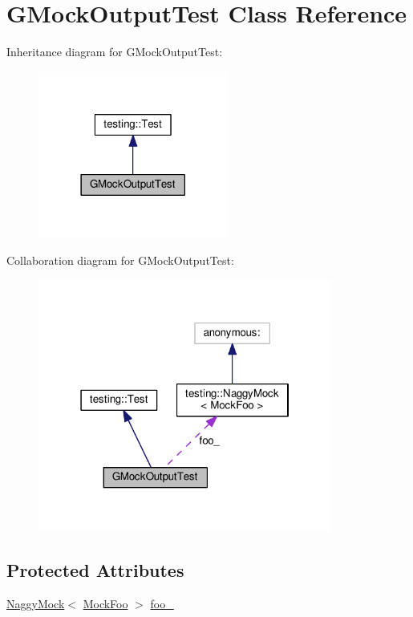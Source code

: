 \hypertarget{classGMockOutputTest}{}\section{G\+Mock\+Output\+Test Class Reference}
\label{classGMockOutputTest}


Inheritance diagram for G\+Mock\+Output\+Test\+:
\nopagebreak
\begin{figure}[H]
\begin{center}
\leavevmode
\includegraphics[width=177pt]{classGMockOutputTest__inherit__graph}
\end{center}
\end{figure}


Collaboration diagram for G\+Mock\+Output\+Test\+:
\nopagebreak
\begin{figure}[H]
\begin{center}
\leavevmode
\includegraphics[width=274pt]{classGMockOutputTest__coll__graph}
\end{center}
\end{figure}
\subsection*{Protected Attributes}
\begin{DoxyCompactItemize}
\item 
\hyperlink{classtesting_1_1NaggyMock}{Naggy\+Mock}$<$ \hyperlink{classMockFoo}{Mock\+Foo} $>$ \hyperlink{classGMockOutputTest_aed97d2ca515d69466968c60575cc18a2}{foo\+\_\+}
\end{DoxyCompactItemize}
